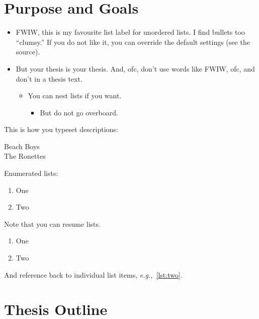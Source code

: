 \documentclass[11pt,titlepage,openright]{book}
\newcommand{\eg}{\emph{e.g.,}}
\begin{document}
\section{Purpose and Goals}

\lipsum[4-6]

\begin{itemize}
\item FWIW, this is my favourite list label for unordered lists. I
  find bullets too ``clumsy.'' If you do not like it, you can
  override the default settings (see the source).
\item But your thesis is your thesis. And, ofc, don't use words
  like FWIW, ofc, and don't in a thesis text.

  \begin{itemize}
  \item You can nest lists if you want.

    \begin{itemize}
    \item But do not go overboard.
    \end{itemize}

  \end{itemize}
  
\end{itemize}

This is how you typeset descriptions:

\begin{description}
\item[Beach Boys] \lipsum[1]
\item[The Ronettes] \lipsum[2]
\end{description}

Enumerated lists:

\begin{enumerate}
\item One
\item Two
\end{enumerate}

Note that you can resume lists.

\begin{enumerate}[resume]
\item One
\item Two \label{lst:two}
\end{enumerate}

And reference back to individual list items, \eg{}~\cref{lst:two}.

\section{Thesis Outline}
\end{document}
